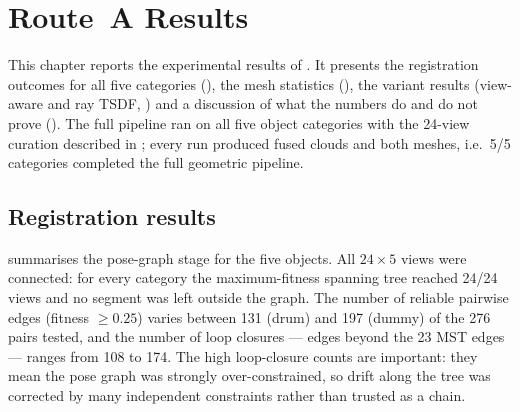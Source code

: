 \chapter{Route~A Results}
\label{ch:resultsA}

This chapter reports the experimental results of \routeA{}. It presents the
registration outcomes for all five \suop{} categories
(), the mesh statistics
(), the variant results (view-aware and ray TSDF,
) and a discussion of what the numbers do and do
not prove (). The full pipeline ran on all
five object categories with the 24-view curation described in
; every run produced fused clouds and both meshes, i.e.\
5/5 categories completed the full geometric pipeline.

\section{Registration results}
\label{sec:resultsA_registration}

 summarises the pose-graph stage for the five
objects. All $24 \times 5$ views were connected: for every category the
maximum-fitness spanning tree reached 24/24 views and no segment was left
outside the graph. The number of reliable pairwise edges (fitness $\geq 0.25$)
varies between 131 (drum) and 197 (dummy) of the 276 pairs tested, and the
number of loop closures --- edges beyond the 23 MST edges --- ranges from 108
to 174. The high loop-closure counts are important: they mean the pose graph
was strongly over-constrained, so drift along the tree was corrected by many
independent constraints rather than trusted as a chain.

